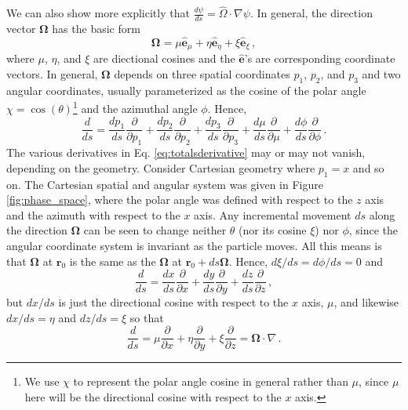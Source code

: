 We can also show more explicitly that $\frac{d\psi}{ds} = \hat{\Omega} \cdot \nabla \psi$.  In general, the direction vector $\mathbf{\Omega}$ has the basic form
\begin{equation}
 \mathbf{\Omega} = \mu \mathbf{\hat{e}}_{\mu} + \eta \mathbf{\hat{e}}_{\eta} + \xi \mathbf{\hat{e}}_{\xi} \, ,
\end{equation}
where $\mu$, $\eta$, and $\xi$ are diectional cosines and the $\mathbf{\hat{e}}$'s are corresponding coordinate vectors.  In general, $\mathbf{\Omega}$ depends on three spatial coordinates $p_1$, $p_2$, and $p_3$ and two angular coordinates, usually parameterized as the cosine of the polar angle $\chi = \cos(\theta)$\footnote{We use $\chi$ to represent the polar angle cosine in general rather than $\mu$, since $\mu$ here will be the directional cosine with respect to the $x$ axis.} and the azimuthal angle $\phi$.  Hence,
\begin{equation}
 \frac{d}{ds} = \frac{dp_1}{ds}\frac{\partial}{\partial p_1} + \frac{dp_2}{ds}\frac{\partial}{\partial p_2} + \frac{dp_3}{ds}\frac{\partial}{\partial p_3} + \frac{d\mu}{ds}\frac{\partial}{\partial \mu} + \frac{d\phi}{ds}\frac{\partial}{\partial \phi} \, .
 \label{eq:totalsderivative}
\end{equation}
The various derivatives in Eq. \ref{eq:totalsderivative} may or may not vanish, depending on the geometry.  Consider Cartesian geometry where $p_1 = x$ and so on.  The Cartesian spatial and angular system was given in Figure \ref{fig:phase_space}, where the polar angle was defined with respect to the $z$ axis and the azimuth with respect to the $x$ axis.  Any incremental movement $ds$ along the direction $\mathbf{\Omega}$ can be seen  to change neither $\theta$ (nor its cosine $\xi$) nor $\phi$, since the angular coordinate system is invariant as the particle moves.  All this means is that $\mathbf{\Omega}$ at $\mathbf{r}_0$ is the same as the $\mathbf{\Omega}$ at $\mathbf{r}_0 + ds\mathbf{\Omega}$.  Hence, $d\xi/ds = d\phi/ds = 0$ and
\begin{equation}
 \frac{d}{ds} = \frac{dx}{ds}\frac{\partial}{\partial x} + \frac{dy}{ds}\frac{\partial}{\partial y} + \frac{dz}{ds}\frac{\partial}{\partial z} \, ,
\end{equation}
but $dx/ds$ is just the directional cosine with respect to the $x$ axis, $\mu$, and likewise $dx/ds = \eta$ and $dz/ds = \xi$ so that
\begin{equation}
 \frac{d}{ds} = \mu \frac{\partial}{\partial x} + \eta \frac{\partial}{\partial y} + \xi \frac{\partial}{\partial z} = \mathbf{\Omega} \cdot \nabla  \, .
\end{equation}

